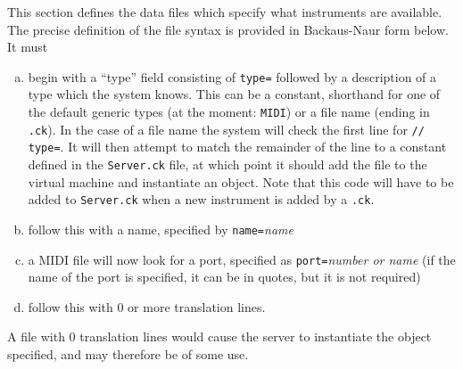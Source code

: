 \documentclass[12pt]{article}
\begin{document}
This section defines the data files which specify what instruments are available. The precise definition of the file syntax is provided in 
Backaus-Naur form below. 
It must 
\begin{enumerate} [a)]
\item{begin with a ``type'' field consisting of \texttt{type=} followed by a description of a type which the system knows. This can be
a constant, shorthand for one of the default generic types (at the moment: \texttt{MIDI}) or a file name (ending in \texttt{.ck}). In the case of a file name
the system will check the first line for \texttt{// type=}. It will then attempt to match the remainder of the line to a constant defined in the \texttt{Server.ck}
file, at which point it should add the file to the virtual machine and instantiate an object. Note that this code will have to be added to \texttt{Server.ck}
when a new instrument is added by a \texttt{.ck}.}
\item{follow this with a name, specified by \texttt{name=}\textit{name}}
\item{a MIDI file will now look for a port, specified as \texttt{port=}\textit{number or name}} (if the name of the port is specified, it can be in quotes,
 but it is not required)
\item{follow this with 0 or more translation lines.}

\end{enumerate}

A file with 0 translation lines would cause the server to instantiate the object specified, and may therefore be of some use.
\end{document}
